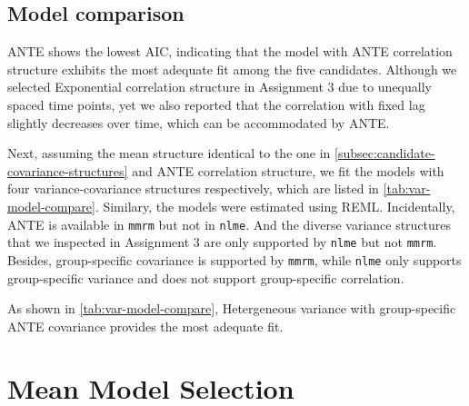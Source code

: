 \documentclass[12pt]{article}
\begin{document}
\subsection{Model comparison}

ANTE shows the lowest AIC, indicating that the model
with ANTE correlation structure exhibits the most
adequate fit among the five candidates.
Although we selected Exponential correlation structure
in Assignment 3 due to unequally spaced time points,
yet we also reported that the correlation with fixed lag
slightly decreases over time, which can
be accommodated by ANTE.

Next, assuming the mean structure identical to the one
in \cref{subsec:candidate-covariance-structures} and
ANTE correlation structure, we fit the models
with four variance-covariance structures respectively,
which are listed in \cref{tab:var-model-compare}.
Similary, the models were estimated using REML.
Incidentally, ANTE is available in \texttt{mmrm}
but not in \texttt{nlme}. And the diverse variance structures
that we inspected in Assignment 3
are only supported by \texttt{nlme} but not \texttt{mmrm}.
Besides, group-specific covariance is supported by
\texttt{mmrm}, while \texttt{nlme} only supports
group-specific variance and does not support 
group-specific correlation.

\begin{table}[htbp]
\caption{Model comparison for candidate variance-covariance structures under ANTE}
\label{tab:var-model-compare}
\centering
{}
\end{table}

As shown in \cref{tab:var-model-compare},
Hetergeneous variance with group-specific ANTE covariance
provides the most adequate fit.

\section{Mean Model Selection}\label{sec:Mean-Model-Selection}
\end{document}
